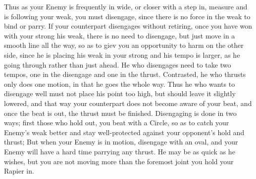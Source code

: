 
Thus as your Enemy is frequently in wide, or closer with a step in,
measure and is following your weak, you must disengage, since there is no
force in the weak to bind or parry. If your counterpart disengages without
retiring, once you have won with your strong his weak, there is no
need to disengage, but just move in a smooth line all the way, so as to
giev you an opportunity to harm on the other side, since he is placing
his weak in your strong and his tempo is larger, as he going through
rather than just ahead. He who disengages need to take two tempos, one in
the disengage and one in the thrust. Contrasted, he who thrusts only does
one motion, in that he goes the whole way. Thus he who wants to disengage
well must not place his point too high, but should leave it slightly
lowered, and that way your counterpart does not become aware of your
beat, and once the beat is out, the thrust must be finished. Disengaging
is done in two ways; first those who hold out, you beat with a Circle,
so as to catch your Enemy's weak better and stay well-protected
against your opponent's hold and thrust; But when your Enemy is in
motion, disengage with an oval, and your Enemy will have a hard time
parrying any thrust. He may be as quick as he wishes, but you are not
moving more than the foremost joint you hold your Rapier in.

